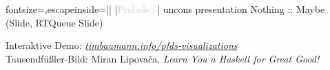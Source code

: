 \documentclass{beamer}
\newcommand{\ghci}{\textcolor{lightgray}{Prelude>}} %
\begin{document}
{
\begin{frame}[fragile]
\begin{haskellcode*}{fontsize=\Large,escapeinside=||}
|\ghci| uncons presentation
Nothing :: Maybe (Slide, RTQueue Slide)
\end{haskellcode*}

\vspace{6cm}

{
  \color{gray}
  Interaktive Demo: \href{http://timbaumann.info/pfds-visualizations/}{\textit{timbaumann.info/pfds-visualizations}} \\
  Tausendfüßler-Bild: Miran Lipovača, \textit{Learn You a Haskell for Great Good!}
}
\end{frame}
}
\end{document}
